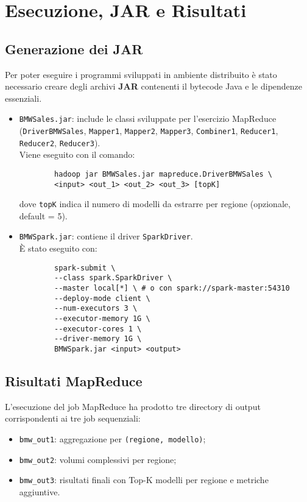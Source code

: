 \chapter{Esecuzione, JAR e Risultati}
	
	\section{Generazione dei JAR}
		Per poter eseguire i programmi sviluppati in ambiente distribuito è stato necessario creare degli archivi \textbf{JAR} contenenti il bytecode Java e le dipendenze essenziali.
		\begin{itemize}
			\item \texttt{BMWSales.jar}: include le classi sviluppate per l’esercizio MapReduce (\texttt{DriverBMWSales}, \texttt{Mapper1}, \texttt{Mapper2}, \texttt{Mapper3}, \texttt{Combiner1}, \texttt{Reducer1}, \texttt{Reducer2}, \texttt{Reducer3}). \\
			Viene eseguito con il comando:
			\begin{verbatim}
        hadoop jar BMWSales.jar mapreduce.DriverBMWSales \
        <input> <out_1> <out_2> <out_3> [topK]
			\end{verbatim}
			dove \texttt{topK} indica il numero di modelli da estrarre per regione (opzionale, default = 5).
			
			\item \texttt{BMWSpark.jar}: contiene il driver \texttt{SparkDriver}. \\
			È stato eseguito con:
			\begin{verbatim}
        spark-submit \
        --class spark.SparkDriver \
        --master local[*] \ # o con spark://spark-master:54310
        --deploy-mode client \
        --num-executors 3 \
        --executor-memory 1G \
        --executor-cores 1 \
        --driver-memory 1G \
        BMWSpark.jar <input> <output>
			\end{verbatim}
		\end{itemize}
	
	\section{Risultati MapReduce}
		L’esecuzione del job MapReduce ha prodotto tre directory di output corrispondenti ai tre job sequenziali:
		
		\begin{itemize}
			\item \texttt{bmw\_out1}: aggregazione per \texttt{(regione, modello)};
			\item \texttt{bmw\_out2}: volumi complessivi per regione;
			\item \texttt{bmw\_out3}: risultati finali con Top-K modelli per regione e metriche aggiuntive.
		\end{itemize}
		
